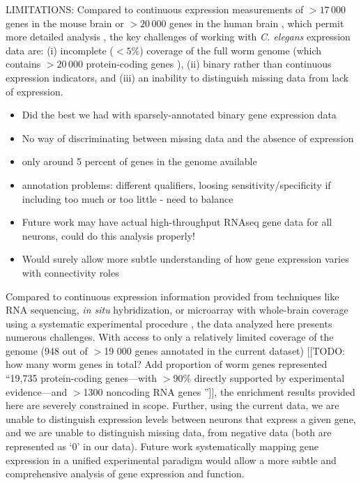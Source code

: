 \documentclass[10pt,letterpaper]{article}
\begin{document}
LIMITATIONS:
Compared to continuous expression measurements of $>17\,000$ genes in the mouse brain \cite{Lein:2007jn} or $>20\,000$ genes in the human brain \cite{Hawrylycz:2012ky}, which permit more detailed analysis \cite{Fulcher:2016ck, Ji:2014jw, Fakhry:2015kl, French2011, Vertes2016a, Parkes:2017dn}, the key challenges of working with \emph{C. elegans} expression data are:
(i) incomplete ($<5$\%) coverage of the full worm genome (which contains $>20\,000$ protein-coding genes \cite{Harris:2009kd}),
(ii) binary rather than continuous expression indicators, and
(iii) an inability to distinguish missing data from lack of expression.
\begin{itemize}
    \item Did the best we had with sparsely-annotated binary gene expression data
    \item No way of discriminating between missing data and the absence of expression
    \item only around 5 percent of genes in the genome available
    \item annotation problems: different qualifiers, loosing sensitivity/specificity if including too much or too little - need to balance
    \item Future work may have actual high-throughput RNAseq gene data for all neurons, could do this analysis properly!
    \item Would surely allow more subtle understanding of how gene expression varies with connectivity roles
\end{itemize}

Compared to continuous expression information provided from techniques like RNA sequencing, \emph{in situ} hybridization, or microarray with whole-brain coverage using a systematic experimental procedure \cite{Lein:2007jn, Shen:2012ua, Tasic:2016jp}, the data analyzed here presents numerous challenges.
With access to only a relatively limited coverage of the genome (948 out of $>$19 000 genes \cite{Hillier2005} annotated in the current dataset) [[TODO: how many worm genes in total? Add proportion of worm genes represented ``19,735 protein-coding genes—with $>$90\% directly supported by experimental evidence—and $>$1300 noncoding RNA genes \cite{Hillier2005}'']], the enrichment results provided here are severely constrained in scope.
Further, using the current data, we are unable to distinguish expression levels between neurons that express a given gene, and we are unable to distinguish missing data, from negative data (both are represented as `0' in our data).
Future work systematically mapping gene expression in a unified experimental paradigm would allow a more subtle and comprehensive analysis of gene expression and function.
\end{document}
